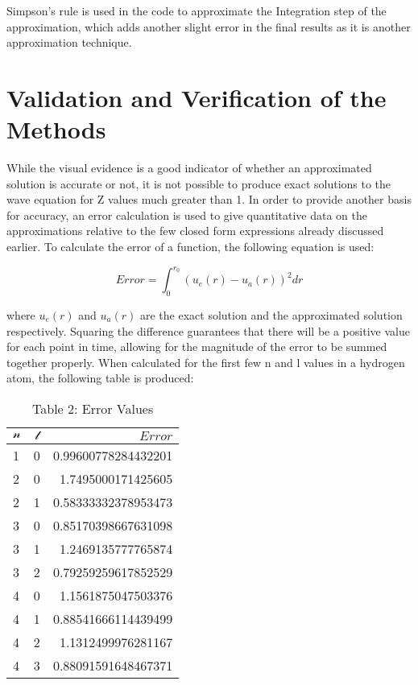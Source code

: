 \documentclass{article}
\begin{document}
\begin{multicols}{2}
\normalsize{
Simpson's rule is used in the code to approximate the Integration step of the approximation, which adds another slight error in the final results as it is another approximation technique.
}
\section{Validation and Verification of the Methods}
While the visual evidence is a good indicator of whether an approximated solution is accurate or not, it is not possible to produce exact solutions to the wave equation for Z values much greater than 1. In order to provide another basis for accuracy, an error calculation is used to give quantitative data on the approximations relative to the few closed form expressions already discussed earlier. To calculate the error of a function, the following equation is used:

\begin{equation}
\label{equation8}
Error = \int_0^{r_0}\left( u_e(r) - u_a(r)\right)^2 dr
\end{equation}

where $u_e(r)$ and $u_a(r)$ are the exact solution and the approximated solution respectively. Squaring the difference guarantees that there will be a positive value for each point in time, allowing for the magnitude of the error to be summed together properly.  When calculated for the first few n and l values in a hydrogen atom, the following table is produced:

\end{multicols}

\begin{table}[h!]
    \caption{Table 2: Error Values}
    \vspace{0.05in}
    \label{tab:table2}
    \begin{center}
    \begin{tabular}{l|c|r} 
      $\mathcal{n}$ &  $\mathcal{l}$ & $Error$ \hspace{0.53in} \\
      \hline
      1 & 0 & 0.99600778284432201\\
      2 & 0 & 1.7495000171425605\\
      2 & 1 & 0.58333332378953473\\
      3 & 0 & 0.85170398667631098\\
      3 & 1 & 1.2469135777765874\\
      3 & 2 & 0.79259259617852529\\
      4 & 0 & 1.1561875047503376\\
      4 & 1 & 0.88541666114439499\\
      4 & 2 & 1.1312499976281167\\
      4 & 3 & 0.88091591648467371\\
    \end{tabular}
    \end{center}
\end{table}
\end{document}
